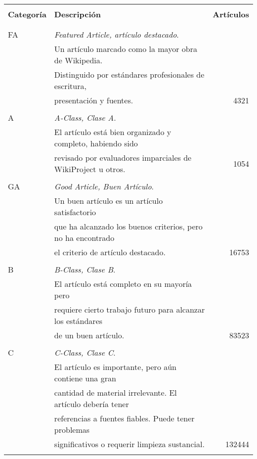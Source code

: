 \begin{table}
\begin{center}
\renewcommand{\arraystretch}{0.9}
\begin{tabular}{l  l  r}
	\hline
	& & \\
	{\bf Categor\'ia}	& {\bf Descripci\'on}									& {\bf Art\'iculos} \\ \\
	\hline
	& & \\
	FA 			& \emph{Featured Article, art\'iculo destacado}.  \\
				& Un art\'iculo marcado como la mayor obra de Wikipedia. \\
				& Distinguido por est\'andares profesionales de escritura, \\
				& presentaci\'on y fuentes.  & 4321 \\ \\
	A 			& \emph{A-Class, Clase A}.  \\
				& El art\'iculo est\'a bien organizado y completo, habiendo sido \\
				& revisado por evaluadores imparciales de WikiProject u otros. & 1054 \\ \\
	GA 			& \emph{Good Article, Buen Art\'iculo}.  \\
				& Un buen art\'iculo es un art\'iculo satisfactorio \\
				& que ha alcanzado los buenos criterios, pero no ha encontrado  \\
				& el criterio de art\'iculo destacado. & 16753 \\ \\
	B 			& \emph{B-Class, Clase B}.  \\
				& El art\'iculo est\'a completo en su mayor\'ia pero \\
				& requiere cierto trabajo futuro para alcanzar los est\'andares \\
				& de un buen art\'iculo. & 83523 \\ \\		
	C 			& \emph{C-Class, Clase C}.  \\
				& El art\'iculo es importante, pero a\'un contiene una gran  \\
				& cantidad de material irrelevante. El art\'iculo deber\'ia tener \\
				& referencias a fuentes fiables. Puede tener problemas \\
				& significativos o requerir limpieza sustancial. & 132444 \\ \\

\end{tabular}
\end{center}
\end{table}
